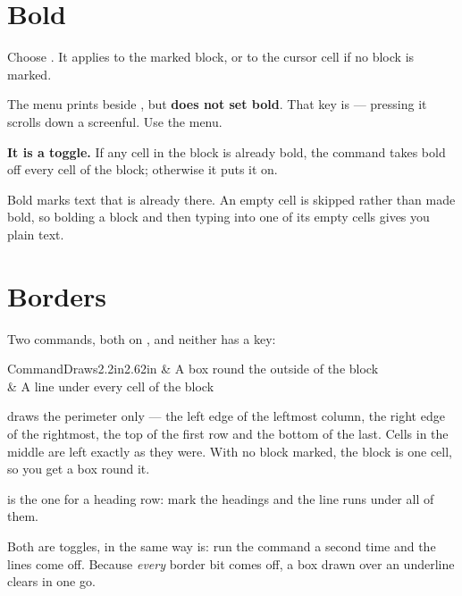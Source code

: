 \section{Bold}

Choose . It applies to the marked block, or to the
cursor cell if no block is marked.

\begin{cccaution}
The menu prints  beside , but \textbf{
does not set bold}. That key is  --- pressing it scrolls down a
screenful. Use the menu.
\end{cccaution}

\textbf{It is a toggle.} If any cell in the block is already bold, the command
takes bold off every cell of the block; otherwise it puts it on.

\begin{ccnote}
Bold marks text that is already there. An empty cell is skipped rather than
made bold, so bolding a block and then typing into one of its empty cells
gives you plain text.
\end{ccnote}

\section{Borders}

Two commands, both on , and neither has a key:

\begin{cctable}{Command}{Draws}{2.2in}{2.62in}
 & A box round the outside of the block \\
 & A line under every cell of the block \\
\end{cctable}

 draws the perimeter only --- the left edge of the leftmost
column, the right edge of the rightmost, the top of the first row and the
bottom of the last. Cells in the middle are left exactly as they were. With no
block marked, the block is one cell, so you get a box round it.

 is the one for a heading row: mark the headings and the
line runs under all of them.

Both are toggles, in the same way  is: run the command a second
time and the lines come off. Because \emph{every} border bit comes off, a box
drawn over an underline clears in one go.

